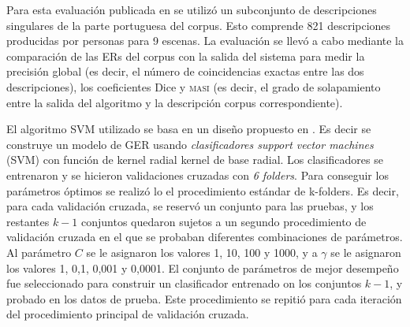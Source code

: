 Para esta evaluaci\'on publicada en \cite{DBLP:conf/acl/AltamiranoFPB15} se utiliz\'o un subconjunto de descripciones singulares de la parte portuguesa del corpus. Esto comprende 821 descripciones producidas por personas para 9 escenas. La evaluaci\'on se llev\'o a cabo mediante la comparaci\'on de las ERs del corpus con la salida del sistema para medir la precisi\'on global (es decir, el n\'umero de coincidencias exactas entre las dos descripciones), los coeficientes Dice \cite{dice} y \textsc{masi} \cite{masi} (es decir, el grado de solapamiento entre la salida del algoritmo y la descripci\'on corpus correspondiente).

El algoritmo SVM utilizado se basa en un dise\~no propuesto en \cite{thiago-svm}. Es decir se construye un modelo de GER usando {\it clasificadores support vector machines} (SVM) con funci\'on de kernel radial kernel de base radial. Los clasificadores se entrenaron y se hicieron validaciones cruzadas con {\it 6 folders}. Para conseguir los par\'ametros \'optimos se realiz\'o lo el procedimiento est\'andar de k-folders. Es decir, para cada validaci\'on cruzada, se reserv\'o un conjunto para las pruebas, y los restantes $k-1$ conjuntos quedaron sujetos a un segundo procedimiento de validaci\'on cruzada en el que se probaban diferentes combinaciones de par\'ametros. Al par\'ametro $C$ se le asignaron los valores 1, 10, 100 y 1000, y a $\gamma$ se le asignaron los valores 1, 0,1, 0,001 y 0,0001. El conjunto de par\'ametros de mejor desempe\~no fue seleccionado para construir un clasificador entrenado on los conjuntos $k-1$, y probado en los datos de prueba. Este procedimiento se repiti\'o para cada iteraci\'on del procedimiento principal de validaci\'on cruzada.



